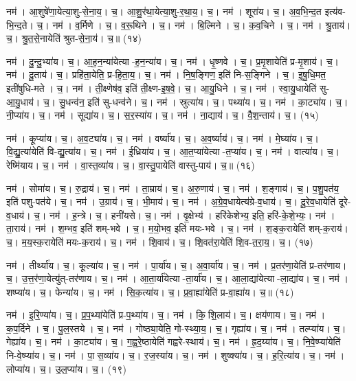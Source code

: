 नम॑। आ॒शुषे॑णा॒येत्या॒शु-से॒ना॒य॒। च॒। आ॒शु॒र॑था॒येत्या॒शु-र॒था॒य॒। च॒। 
नम॑। शूरा॑य। च॒। अ॒व॒भि॒न्द॒त इत्य॑व-भि॒न्द॒ते। च॒। 
नम॑। व॒र्मिणे। च॒। व॒रू॒थिने। च॒। 
नम॑। बि॒ल्मिने। च॒। क॒व॒चिने। च॒। 
नम॑। श्रु॒ताय॑। च॒। श्रु॒त॒से॒नायेति॑ श्रुत-से॒ना॒य॑। च॒॥ (१४)


नम॑। दु॒न्दु॒भ्या॑य। च॒। आ॒ह॒न॒न्या॑येत्या-ह॒न॒न्या॑य। च॒। 
नम॑। धृ॒ष्णवे। च॒। प्र॒मृ॒शायेति॑ प्र-मृ॒शाय॑। च॒। 
नम॑। दू॒ताय॑। च॒। प्रहि॑ता॒येति॒ प्र-हि॒ता॒य॒। च॒। 
नम॑। नि॒ष॒ङ्गिण॒ इति॑ नि-स॒ङ्गिने। च॒। इ॒षु॒धि॒मत॒ इती॑षुधि-मते। च॒। 
नम॑। ती॒क्ष्णेष॑व॒ इति॑ ती॒क्ष्ण-इ॒ष॒वे॒। च॒। आ॒यु॒धिने। च॒। 
नम॑। स्वा॒यु॒धायेति॑ सु-आ॒यु॒धाय॑। च॒। सु॒धन्व॑न॒ इति॑ सु-धन्व॑ने। च॒। 
नम॑। स्रुत्या॑य। च॒। पथ्या॑य। च॒। 
नम॑। का॒ट्या॑य। च॒। नी॒प्या॑य। च॒। 
नम॑। सूद्या॑य। च॒। स॒र॒स्या॑य। च॒। 
नम॑। ना॒द्याय॑। च॒। वै॒श॒न्ताय॑। च॒। (१५)


नम॑। कूप्या॑य। च॒। अ॒व॒ट्या॑य। च॒। 
नम॑। वर्ष्या॑य। च॒। अ॒व॒र्ष्याय॑। च॒। 
नम॑। मे॒घ्या॑य। च॒। वि॒द्यु॒त्या॑येति॑ वि-द्यु॒त्या॑य। च॒। 
नम॑। ई॒ध्रिया॑य। च॒। आ॒त॒प्या॑येत्या-त॒प्या॑य। च॒। 
नम॑। वात्या॑य। च॒। रेष्मि॑याय। च॒। 
नम॑। वा॒स्त॒व्या॑य। च॒। वा॒स्तु॒पायेति॑ वास्तु-पाय॑। च॒॥ (१६)


नम॑। सोमा॑य। च॒। रु॒द्राय॑। च॒। 
नम॑। ता॒म्राय॑। च॒। अ॒रु॒णाय॑। च॒। 
नम॑। श॒ङ्गाय॑। च॒। प॒शु॒पत॑य॒ इति॑ पशु-पत॑ये। च॒। 
नम॑। उ॒ग्राय॑। च॒। भी॒माय॑। च॒। 
नम॑। अ॒ग्रे॒व॒धायेत्य॑ग्रे-व॒धाय॑। च॒। दू॒रे॒व॒धायेति॑ दूरे-व॒धाय॑। च॒। 
नम॑। ह॒न्त्रे। च॒। हनी॑यसे। च॒। 
नम॑। वृ॒क्षेभ्य॑। हरि॑केशेभ्य॒ इति॒ हरि॑-के॒शे॒भ्यः॒। 
नम॑। ता॒राय॑। नम॑। श॒म्भव॒ इति॑ शम्-भवे। च॒। म॒यो॒भव॒ इति॑ मयः-भवे। च॒। 
नम॑। श॒ङ्क॒रायेति॑ शम्-क॒राय॑। च॒। म॒य॒स्क॒रायेति॑ मयः-क॒राय॑। च॒। 
नम॑। शि॒वाय॑। च॒। शि॒वत॑रा॒येति॑ शि॒व-त॒रा॒य॒। च॒। (१७)


नम॑। तीर्थ्या॑य। च॒। कूल्या॑य। च॒। 
नम॑। पा॒र्या॑य। च॒। अ॒वा॒र्या॑य। च॒। 
नम॑। प्र॒तर॑णा॒येति॑ प्र-तर॑णाय। च॒। उ॒त्त॒र॑णा॒येत्यु॑त्-तर॑णाय। च॒। 
नम॑। आ॒ता॒र्या॑येत्या-ता॒र्या॑य। च॒। आ॒ला॒द्या॑येत्या-ला॒द्या॑य। च॒। 
नम॑। शष्प्या॑य। च॒। फेन्या॑य। च॒। 
नम॑। सि॒क॒त्या॑य। च॒। प्र॒वा॒ह्या॑येति॑ प्र-वा॒ह्या॑य। च॒॥ (१८)


नम॑। इ॒रि॒ण्या॑य। च॒। प्र॒प॒थ्या॑येति॑ प्र-प॒थ्या॑य। च॒। 
नम॑। कि॒शि॒लाय॑। च॒। क्षय॑णाय। च॒। 
नम॑। क॒प॒र्दिने। च॒। पु॒ल॒स्तये। च॒। 
नम॑। गोष्ठ्या॒येति॒ गो-स्थ्या॒य॒। च॒। गृह्या॑य। च॒। 
नम॑। तल्प्या॑य। च॒। गेह्या॑य। च॒। 
नम॑। का॒ट्या॑य। च॒। ग॒ह्व॒रे॒ष्ठायेति॑ गह्वरे-स्थाय॑। च॒। 
नम॑। ह्र॒द॒य्या॑य। च॒। नि॒वे॒ष्प्या॑येति॑ नि-वे॒ष्प्या॑य। च॒। 
नम॑। पा॒स॒व्या॑य। च॒। र॒ज॒स्या॑य। च॒। 
नम॑। शुष्क्या॑य। च॒। ह॒रि॒त्या॑य। च॒। 
नम॑। लोप्या॑य। च॒। उ॒ल॒प्या॑य। च॒। (१९)


